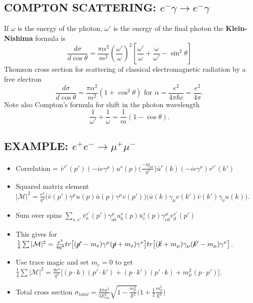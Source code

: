 \documentclass[a4paper, norsk, 8pt, landscape]{article}
\begin{document}
\begin{multicols*}{3}
\subsection*{\small COMPTON SCATTERING: $e^- \gamma \rightarrow e^- \gamma$}
If $\omega$ is the energy of the photon, $\omega'$ is the energy of the final photon the
\textbf{Klein-Nishima} formula is
\[
\frac{d \sigma}{d \cos \theta}
= \frac{\pi \alpha^2}{m^2} \left(\frac{\omega'}{\omega} \right)^2
\left[\frac{\omega'}{\omega} + \frac{\omega}{\omega'} - \sin^2 \theta \right]
\]
Thomson cross section for scattering of classical electromagnetic radiation by a free electron
\[
\frac{d \sigma}{d \cos \theta}
= \frac{\pi \alpha^2}{m^2}(1+\cos^2 \theta) \text{ for } \alpha=\frac{e^2}{4\pi \hbar c} = \frac{e^2}{4\pi}.
\]
Note also Compton's formula for shift in the photon wavelength
\[
\frac{1}{\omega'} + \frac{1}{\omega} = \frac{1}{m}(1-\cos \theta).
\]

\subsection*{\small EXAMPLE: $e^+e^- \rightarrow \mu^+ \mu^-$}
\begin{itemize}
\item Correlation = $\bar{v}^{s'}(p')(-ie\gamma^{\mu})u^s(p)\big( \frac{-ig_{\mu \nu}}{q^2} \big) \bar{u}^r(k) (-ie\gamma^{\nu})v^{r'}(k')$
\item Squared matrix element \\
      $|\mathcal{M}|^2 = \frac{e^4}{q^4}\big( \bar{v}(p')\gamma^{\mu}u(p) \bar{u}(p)\gamma^{\mu} v(p') \big) \big(\bar{u}(k) \gamma_{\mu} v(k') \bar{v}(k') \gamma_{\nu} u(k) \big)$.
\item Sum over spins $\sum_{s,s'} \bar{v}_a^{s'}(p')\gamma^{\mu}_{ab} u_b^s(p )\bar{u}^s_c(p)\gamma^{\mu}_{cd}v_d^{s'}(p')$
\item This gives for \\
      $\frac{1}{4} \sum|\mathcal{M}|^2 = \frac{e^4}{4q^4} tr\big[(\cancel{p}' - m_e)\gamma^{\mu}(\cancel{p}+m_e) \gamma^{\nu} \big] tr \big[ (\cancel{k}+m_{\mu}) \gamma_{\mu}(\cancel{k}'-m_{\mu})\gamma^{\nu} \big]$.
\item Use trace magic and set $m_e=0$ to get \\
      $\frac{1}{4} \sum |\mathcal{M}|^2 = \frac{8e^4}{q^4} \big[(p \cdot k)(p' \cdot k') + (p \cdot k')(p' \cdot k) + m_{\mu}^2(p \cdot p') \big] $.
\item Total cross section $\sigma_{total} = \frac{4 \pi \alpha^2}{3E_{cm}^2} \sqrt{1-\frac{m_{\mu}^2}{E^2}}\big( 1+ \frac{1}{2} \frac{m_{\mu}^2}{E^2} \big)$
\end{itemize}



\end{multicols*}
\end{document}
